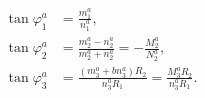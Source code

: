 \begin{equation}
\begin{aligned}
\tan\varphi^a_1 &=\frac{m^a_1}{n^a_1},\\
\tan\varphi^a_2 &=\frac{m^a_2-n^a_2}{m^a_2+n^a_2}=-\frac{M^a_2}{N^a_2},\\
\tan\varphi^a_3 &=\frac{(m^a_3+bn^a_3)R_2}{n^a_3R_1}=\frac{M^a_3R_2}{n^a_3R_1}.
\end{aligned}\label{AppAnglesWrappings}
\end{equation}

